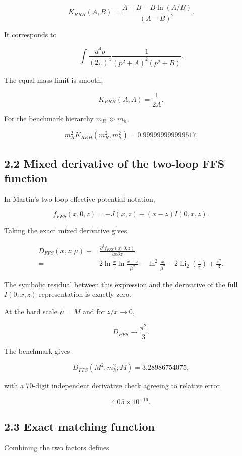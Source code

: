 \documentclass[
  10pt,
]{article}
\begin{document}
\[
\boxed{
K_{RRH}(A,B)
=
\frac{A-B-B\ln(A/B)}{(A-B)^2}.
}
\]

It corresponds to

\[
\int\frac{d^4p}{(2\pi)^4}
\frac{1}{(p^2+A)^2(p^2+B)}.
\]

The equal-mass limit is smooth:

\[
K_{RRH}(A,A)=\frac{1}{2A}.
\]

For the benchmark hierarchy \(m_R\gg m_h\),

\[
m_R^2K_{RRH}(m_R^2,m_h^2)
=0.999999999999517.
\]

\subsection{2.2 Mixed derivative of the two-loop FFS
function}\label{mixed-derivative-of-the-two-loop-ffs-function}

In Martin's two-loop effective-potential notation,

\[
f_{FFS}(x,0,z)
=-J(x,z)+(x-z)I(0,x,z).
\]

Taking the exact mixed derivative gives

\[
\boxed{
\begin{aligned}
D_{FFS}(x,z;\bar\mu)
\equiv{}&
\frac{\partial^2f_{FFS}(x,0,z)}{\partial x\partial z}
\\[1mm]
={}&
2\ln\frac{x}{z}
\ln\frac{x-z}{\bar\mu^2}
-
\ln^2\frac{x}{\bar\mu^2}
-
2\operatorname{Li}_2\left(\frac zx\right)
+
\frac{\pi^2}{3}.
\end{aligned}
}
\]

The symbolic residual between this expression and the derivative of the
full \(I(0,x,z)\) representation is exactly zero.

At the hard scale \(\bar\mu=M\) and for \(z/x\to0\),

\[
D_{FFS}\longrightarrow\frac{\pi^2}{3}.
\]

The benchmark gives

\[
D_{FFS}(M^2,m_h^2;M)=3.28986754075,
\]

with a 70-digit independent derivative check agreeing to relative error

\[
4.05\times10^{-16}.
\]

\subsection{2.3 Exact matching function}\label{exact-matching-function}

Combining the two factors defines
\end{document}
